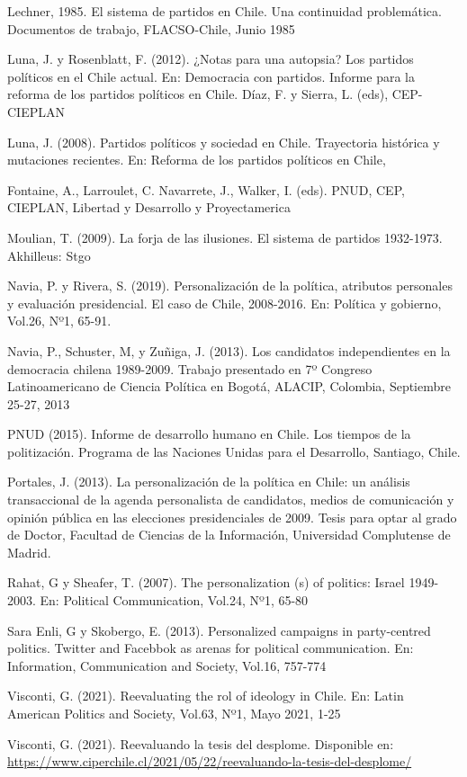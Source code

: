 \documentclass[
  10pt,
  letterpaper,
]{report}
\begin{document}
Lechner, 1985. El sistema de partidos en Chile. Una continuidad
problemática. Documentos de trabajo, FLACSO-Chile, Junio 1985

Luna, J. y Rosenblatt, F. (2012). ¿Notas para una autopsia? Los partidos
políticos en el Chile actual. En: Democracia con partidos. Informe para
la reforma de los partidos políticos en Chile. Díaz, F. y Sierra, L.
(eds), CEP-CIEPLAN

Luna, J. (2008). Partidos políticos y sociedad en Chile. Trayectoria
histórica y mutaciones recientes. En: Reforma de los partidos políticos
en Chile,

Fontaine, A., Larroulet, C. Navarrete, J., Walker, I. (eds). PNUD, CEP,
CIEPLAN, Libertad y Desarrollo y Proyectamerica

Moulian, T. (2009). La forja de las ilusiones. El sistema de partidos
1932-1973. Akhilleus: Stgo

Navia, P. y Rivera, S. (2019). Personalización de la política, atributos
personales y evaluación presidencial. El caso de Chile, 2008-2016. En:
Política y gobierno, Vol.26, Nº1, 65-91.

Navia, P., Schuster, M, y Zuñiga, J. (2013). Los candidatos
independientes en la democracia chilena 1989-2009. Trabajo presentado en
7º Congreso Latinoamericano de Ciencia Política en Bogotá, ALACIP,
Colombia, Septiembre 25-27, 2013

PNUD (2015). Informe de desarrollo humano en Chile. Los tiempos de la
politización. Programa de las Naciones Unidas para el Desarrollo,
Santiago, Chile.

Portales, J. (2013). La personalización de la política en Chile: un
análisis transaccional de la agenda personalista de candidatos, medios
de comunicación y opinión pública en las elecciones presidenciales de
2009. Tesis para optar al grado de Doctor, Facultad de Ciencias de la
Información, Universidad Complutense de Madrid.

Rahat, G y Sheafer, T. (2007). The personalization (s) of politics:
Israel 1949-2003. En: Political Communication, Vol.24, Nº1, 65-80

Sara Enli, G y Skobergo, E. (2013). Personalized campaigns in
party-centred politics. Twitter and Facebbok as arenas for political
communication. En: Information, Communication and Society, Vol.16,
757-774

Visconti, G. (2021). Reevaluating the rol of ideology in Chile. En:
Latin American Politics and Society, Vol.63, Nº1, Mayo 2021, 1-25

Visconti, G. (2021). Reevaluando la tesis del desplome. Disponible en:
\url{https://www.ciperchile.cl/2021/05/22/reevaluando-la-tesis-del-desplome/}
\end{document}
